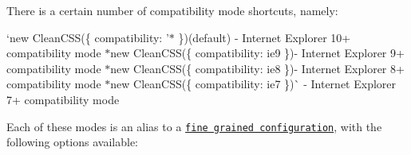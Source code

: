 There is a certain number of compatibility mode shortcuts, namely\+:


\begin{DoxyItemize}
\item `new Clean\+C\+SS(\{ compatibility\+: '$\ast$\textquotesingle{} \}){\ttfamily (default) -\/ Internet Explorer 10+ compatibility mode $\ast$}new Clean\+C\+SS(\{ compatibility\+: \textquotesingle{}ie9\textquotesingle{} \}){\ttfamily -\/ Internet Explorer 9+ compatibility mode $\ast$}new Clean\+C\+SS(\{ compatibility\+: \textquotesingle{}ie8\textquotesingle{} \}){\ttfamily -\/ Internet Explorer 8+ compatibility mode $\ast$}new Clean\+C\+SS(\{ compatibility\+: \textquotesingle{}ie7\textquotesingle{} \})\`{} -\/ Internet Explorer 7+ compatibility mode
\end{DoxyItemize}

Each of these modes is an alias to a \href{https://github.com/jakubpawlowicz/clean-css/blob/master/lib/options/compatibility.js}{\tt fine grained configuration}, with the following options available\+:

